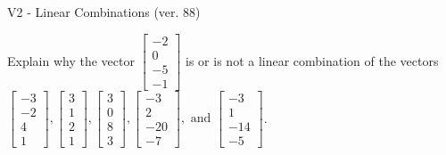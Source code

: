 \begin{exercise}
  \begin{exerciseTitle}V2 - Linear Combinations (ver. 88)\end{exerciseTitle}
  \begin{exerciseStatement}
    Explain why the vector \(\left[\begin{array}{c}
-2 \\
0 \\
-5 \\
-1
\end{array}\right]\)  is or is not a linear 
	combination of the vectors \(\left[\begin{array}{c}
-3 \\
-2 \\
4 \\
1
\end{array}\right] , \left[\begin{array}{c}
3 \\
1 \\
2 \\
1
\end{array}\right] , \left[\begin{array}{c}
3 \\
0 \\
8 \\
3
\end{array}\right] , \left[\begin{array}{c}
-3 \\
2 \\
-20 \\
-7
\end{array}\right] , \text{ and } \left[\begin{array}{c}
-3 \\
1 \\
-14 \\
-5
\end{array}\right]\).
	



\end{exerciseStatement}
\end{exercise}
